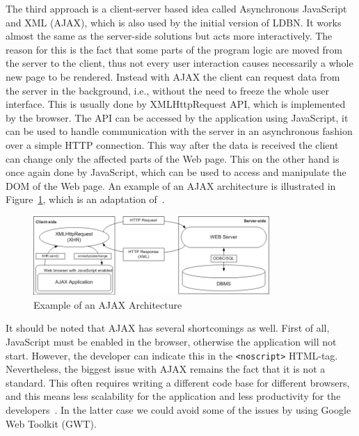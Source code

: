 The third approach is
a client-server based idea called Asynchronous JavaScript and XML (AJAX),
which is also used by the initial version of LDBN. 
It works almost the same as the server-side solutions but acts more interactively. The
reason for this is the fact that some parts of the program logic are moved from the server
to the client, thus not every user interaction causes necessarily a whole new page
to be rendered. Instead with AJAX the client can request 
data from the server in the background, i.e., without the need to freeze the whole user interface. 
This is usually done by XMLHttpRequest API, which is implemented
by the browser. The API can be accessed by the application using JavaScript, it can be
used to handle communication with the server in an asynchronous fashion over a
simple HTTP connection.
This way after the data is received the client can change only the affected parts of the Web page. 
This on the other hand is once again done by JavaScript, which 
can be used to access and manipulate the DOM of the Web page.
An example of an AJAX architecture is illustrated in Figure~\ref{fig:ajax01}, 
which is an adaptation of~\cite[Figure 3.1]{mt1}.

\begin{figure}[h]
	\begin{center}
		\includegraphics[width=0.8\textwidth]{./img/ajax01a.png}
		\caption{Example of an AJAX Architecture}
		\label{fig:ajax01}
	\end{center}
\end{figure}


It should be noted that AJAX has several shortcomings as well. First of all, 
JavaScript must be enabled in the browser, otherwise the application will not start.
However, the developer can indicate this in the \verb=<noscript>= HTML-tag. 
Nevertheless, the biggest issue with AJAX remains the fact that it is not a
standard. This often requires writing a different code base for different
browsers, and this means less scalability for the application and less productivity for
the developers~\cite{bgwt2}. In the latter case we could avoid some of the issues by using 
Google Web Toolkit (GWT).

